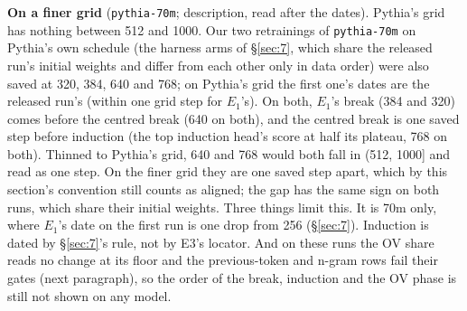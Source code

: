 \documentclass[11pt]{article}
\begin{document}
\textbf{On a finer grid} (\texttt{pythia-70m}; description, read after the dates). Pythia's grid has nothing between 512 and 1000. Our two retrainings of \texttt{pythia-70m} on Pythia's own schedule (the harness arms of \S\ref{sec:7}, which share the released run's initial weights and differ from each other only in data order) were also saved at 320, 384, 640 and 768; on Pythia's grid the first one's dates are the released run's (within one grid step for $E_{1}$'s). On both, $E_{1}$'s break (384 and 320) comes before the centred break (640 on both), and the centred break is one saved step before induction (the top induction head's score at half its plateau, 768 on both). Thinned to Pythia's grid, 640 and 768 would both fall in (512, 1000] and read as one step. On the finer grid they are one saved step apart, which by this section's convention still counts as aligned; the gap has the same sign on both runs, which share their initial weights. Three things limit this. It is 70m only, where $E_{1}$'s date on the first run is one drop from 256 (\S\ref{sec:7}). Induction is dated by \S\ref{sec:7}'s rule, not by E3's locator. And on these runs the OV share reads no change at its floor and the previous-token and n-gram rows fail their gates (next paragraph), so the order of the break, induction and the OV phase is still not shown on any model.
\end{document}

